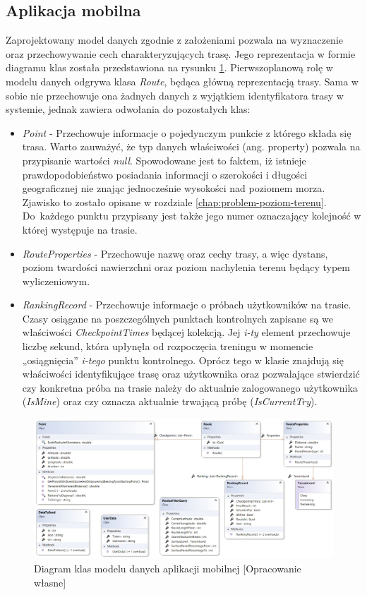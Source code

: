 \subsection{Aplikacja mobilna}\label{chap:model-mobilna}
Zaprojektowany model danych zgodnie z założeniami pozwala na wyznaczenie oraz przechowywanie cech charakteryzujących trasę. Jego reprezentacja w formie diagramu klas została przedstawiona na rysunku \ref{image:xamarin_model}. Pierwszoplanową rolę w modelu danych odgrywa klasa \textit{Route}, będąca główną reprezentacją trasy. Sama w sobie nie przechowuje ona żadnych danych z wyjątkiem identyfikatora trasy w systemie, jednak zawiera odwołania do pozostałych klas:
\begin{itemize}
\item{\textit{Point}} - Przechowuje informacje o pojedynczym punkcie z którego składa się trasa. Warto zauważyć, że typ danych właściwości (ang. {property}) pozwala na przypisanie wartości \textit{null}. Spowodowane jest to faktem, iż istnieje prawdopodobieństwo posiadania informacji o szerokości i długości geograficznej nie znając jednocześnie wysokości nad poziomem morza. Zjawisko to zostało opisane w rozdziale \ref{chap:problem-poziom-terenu}. Do~każdego punktu przypisany jest także jego numer oznaczający kolejność w której występuje na trasie.
\item{\textit{RouteProperties}} - Przechowuje nazwę oraz cechy trasy, a więc dystans, poziom twardości nawierzchni oraz poziom nachylenia terenu będący typem wyliczeniowym.
\item{\textit{RankingRecord}} - Przechowuje informacje o próbach użytkowników na trasie. Czasy osiągane na poszczególnych punktach kontrolnych zapisane są we właściwości \textit{CheckpointTimes} będącej kolekcją. Jej \textit{i-ty} element przechowuje liczbę sekund, która upłynęła od rozpoczęcia treningu w momencie „osiągnięcia” \textit{i-tego} punktu kontrolnego. Oprócz tego w klasie znajdują się właściwości identyfikujące trasę oraz użytkownika oraz pozwalające stwierdzić czy konkretna próba na trasie należy do aktualnie zalogowanego użytkownika (\textit{IsMine}) oraz czy oznacza aktualnie trwającą próbę (\textit{IsCurrentTry}).
\end{itemize}
\begin{figure}[h]\label{fig:xamarin_model}
\begin{center}
\includegraphics[width=\textwidth]{img/xamarin_model.png}
\caption{Diagram klas modelu danych aplikacji mobilnej [Opracowanie własne]}\label{image:xamarin_model}
\end{center}
\end{figure}
